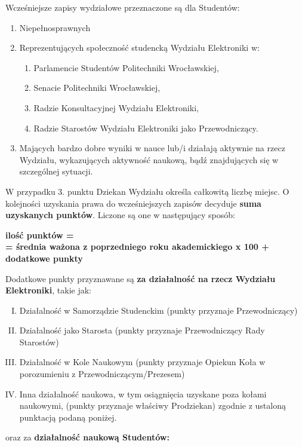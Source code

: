 \documentclass[11pt]{article}
\begin{document}
\indent \hspace{0.5cm}Wcześniejsze zapisy wydziałowe przeznaczone są dla Studentów:
\begin{enumerate}
    \item Niepełnosprawnych
    \item Reprezentujących społeczność studencką Wydziału Elektroniki w:
        \begin{enumerate}
        \item Parlamencie Studentów Politechniki Wrocławskiej,
        \item Senacie Politechniki Wrocławskiej,
        \item Radzie Konsultacyjnej Wydziału Elektroniki,
        \item Radzie Starostów Wydziału Elektroniki jako Przewodniczący.
        \end{enumerate}
    \item Mających bardzo dobre wyniki w nauce lub/i działają aktywnie na rzecz Wydziału,
wykazujących aktywność naukową, bądź znajdujących się w szczególnej sytuacji.
\end{enumerate}
W przypadku 3. punktu Dziekan Wydziału określa całkowitą liczbę miejsc. O kolejności uzyskania prawa do wcześniejszych zapisów decyduje \textbf{suma uzyskanych punktów}. Liczone są one w następujący sposób:
\begin{center}
   \textbf{ ilość punktów = \\= średnia ważona z poprzedniego roku akademickiego x 100 + dodatkowe punkty}
\end{center}
Dodatkowe punkty przyznawane są \textbf{za działalność na rzecz Wydziału Elektroniki}, takie jak:
\begin{enumerate}[I.]
    \item Działalność w Samorządzie Studenckim (punkty przyznaje Przewodniczący) 
    \item Działalność jako Starosta (punkty przyznaje Przewodniczący Rady Starostów) 
    \item Działalność w Kole Naukowym (punkty przyznaje Opiekun Koła w porozumieniu z Przewodniczącym/Prezesem) 
    \item Inna działalność naukowa, w tym osiągnięcia uzyskane poza kołami naukowymi, (punkty przyznaje właściwy Prodziekan) zgodnie z ustaloną punktacją podaną poniżej. 
\end{enumerate}
 oraz za \textbf{działalność naukową Studentów:} 
\end{document}
